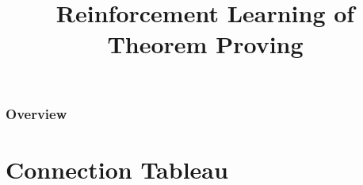 \documentclass{beamer}
\title[RL of Theorem Proving]{Reinforcement Learning of Theorem Proving} %
\begin{document}
\begin{frame}
\titlepage %
\end{frame}

\begin{frame}
\frametitle{Overview} %
\tableofcontents %
\end{frame}
\section{Connection Tableau} 
\end{document}
